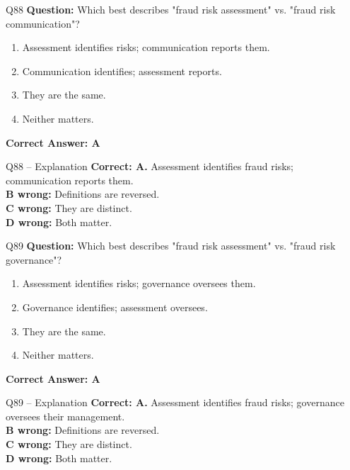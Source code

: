 \documentclass[aspectratio=169,10pt]{beamer}
\begin{document}
	\begin{frame}[t]{Q88}
		\small
		\textbf{Question:} Which best describes "fraud risk assessment" vs. "fraud risk communication"?
		\begin{enumerate}[label=\Alph*.,itemsep=1pt,topsep=2pt]
			\item Assessment identifies risks; communication reports them.
			\item Communication identifies; assessment reports.
			\item They are the same.
			\item Neither matters.
		\end{enumerate}
		\vspace{4pt}
		\textbf{Correct Answer: A}
	\end{frame}
	
	\begin{frame}[t]{Q88 -- Explanation}
		\small
		\textbf{Correct: A.} Assessment identifies fraud risks; communication reports them. \\[4pt]
		\textbf{B wrong:} Definitions are reversed. \\[2pt]
		\textbf{C wrong:} They are distinct. \\[2pt]
		\textbf{D wrong:} Both matter.
	\end{frame}
	
	\begin{frame}[t]{Q89}
		\small
		\textbf{Question:} Which best describes "fraud risk assessment" vs. "fraud risk governance"?
		\begin{enumerate}[label=\Alph*.,itemsep=1pt,topsep=2pt]
			\item Assessment identifies risks; governance oversees them.
			\item Governance identifies; assessment oversees.
			\item They are the same.
			\item Neither matters.
		\end{enumerate}
		\vspace{4pt}
		\textbf{Correct Answer: A}
	\end{frame}
	
	\begin{frame}[t]{Q89 -- Explanation}
		\small
		\textbf{Correct: A.} Assessment identifies fraud risks; governance oversees their management. \\[4pt]
		\textbf{B wrong:} Definitions are reversed. \\[2pt]
		\textbf{C wrong:} They are distinct. \\[2pt]
		\textbf{D wrong:} Both matter.
	\end{frame}
	
\end{document}

